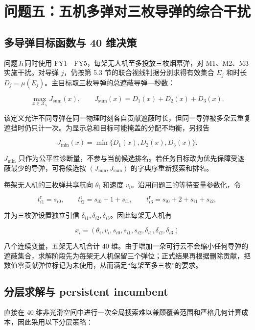 \section{问题五：五机多弹对三枚导弹的综合干扰}

\subsection{多导弹目标函数与 40 维决策}

问题五同时使用 FY1—FY5，每架无人机至多投放三枚烟幕弹，对 M1、M2、M3 实施干扰。对导弹 $j$，仍按第 5.3 节的联合视线判据分别求得有效集合 $E_j$ 和时长 $D_j=\mu(E_j)$。主目标取三枚导弹的总遮蔽导弹—秒数：

\[
\max_{x\in\mathcal X_5}J_{\mathrm{sum}}(x),
\qquad
J_{\mathrm{sum}}(x)=D_1(x)+D_2(x)+D_3(x).
\]

该定义允许不同导弹在同一物理时刻各自贡献遮蔽时长，但同一导弹被多朵云重复遮挡时仍只计一次。为显示总和目标可能掩盖的分配不均衡，另报告

\[
J_{\min}(x)=\min\{D_1(x),D_2(x),D_3(x)\}.
\]

$J_{\min}$ 只作为公平性诊断量，不参与当前候选排名。若任务目标改为优先保障受遮蔽最少的导弹，可将候选按 $(J_{\min},\allowbreak{}J_{\mathrm{sum}})$ 的字典序重新搜索和排名。

每架无人机的三枚弹共享航向 $\theta_i$ 和速度 $v_i$。沿用问题三的等待变量参数化，令

\[
t_{i1}^{\mathrm r}=s_{i0},\qquad
t_{i2}^{\mathrm r}=s_{i0}+1+s_{i1},\qquad
t_{i3}^{\mathrm r}=s_{i0}+2+s_{i1}+s_{i2},
\]

并为三枚弹设置独立引信 $\delta_{i1},\allowbreak{}\delta_{i2},\allowbreak{}\delta_{i3}$。因此每架无人机有

\[
x_i=(\theta_i,v_i,s_{i0},s_{i1},s_{i2},
\delta_{i1},\delta_{i2},\delta_{i3})
\]

八个连续变量，五架无人机合计 40 维。由于增加一朵可行云不会缩小任何导弹的遮蔽集合，求解阶段先为每架无人机保留三个弹位；正式结果再根据删除贡献，把数值零贡献弹位标记为未使用，从而满足“每架至多三枚”的要求。

\subsection{分层求解与 persistent incumbent}

直接在 40 维非光滑空间中进行一次全局搜索难以兼顾覆盖范围和严格几何计算成本，因此采用以下分层策略：

